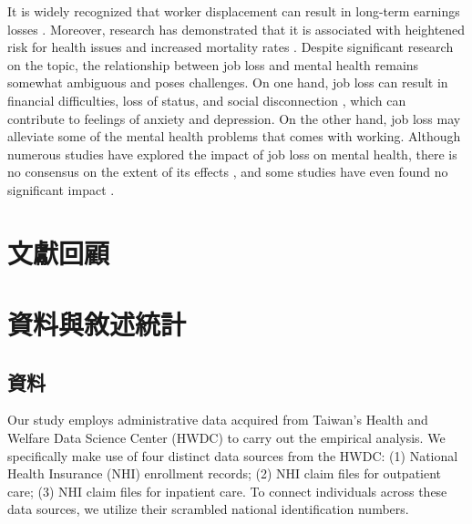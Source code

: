 \documentclass[12pt]{article}
\begin{document}

It is widely recognized that worker displacement can result in long-term earnings losses \citep{Ruhm,Jacobson,lachowska}. Moreover, research has demonstrated that it is associated with heightened risk for health issues and increased mortality rates \citep{Sullivan,Kuhn,Schaller,eliason2009job,eliason2009does,Browning}. Despite significant research on the topic, the relationship between job loss and mental health remains somewhat ambiguous and poses challenges. On one hand, job loss can result in financial difficulties, loss of status, and social disconnection \citep{coope2015characteristics,canavan2021moderating}, which can contribute to feelings of anxiety and depression. On the other hand, job loss may alleviate some of the mental health problems that comes with working. Although numerous studies have explored the impact of job loss on mental health, there is no consensus on the extent of its effects \citep{cygan2017bounding}, and some studies have even found no significant impact \citep{salm2009does,keefe2002serious}.





\section{文獻回顧}

\section{資料與敘述統計}\label{data}

\subsection{資料}
Our study employs administrative data acquired from Taiwan's Health and Welfare Data Science Center (HWDC) to carry out the empirical analysis. We specifically make use of four distinct data sources from the HWDC: (1) National Health Insurance (NHI) enrollment records; (2) NHI claim files for outpatient care; (3) NHI claim files for inpatient care. To connect individuals across these data sources, we utilize their scrambled national identification numbers.
\end{document}
